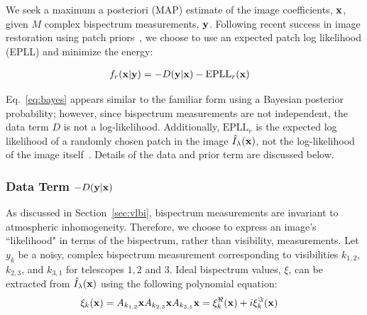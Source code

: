 {%
We seek a maximum a posteriori (MAP) estimate of the image coefficients, ${\bf x}$, given $M$ complex bispectrum measurements, ${\bf y}$.
Following recent success in image restoration using patch priors~\cite{zoran2011learning, zoran2012natural}, we choose to use an expected patch log likelihood (EPLL) and minimize the energy:

\begin{align} 
f_r({\bf x} | {\bf y} )
&=  - D ({\bf y}|{\bf x}) - \mbox{EPLL}_r({\bf x})
\label{eq:bayes}
\end{align}
 \vspace{-.2in}


Eq.~\ref{eq:bayes} appears similar to the familiar form using a Bayesian posterior probability; however, since bispectrum measurements are not independent, the data term $D$ is not a log-likelihood. Additionally, $\mbox{EPLL}_r$ is the expected log likelihood of a randomly chosen patch in the image $\hat{I}_{\lambda}({\bf x})$, not the log-likelihood of the image itself~\cite{zoran2011learning}. 
Details of the data and prior term are discussed below. 



\subsubsection{Data Term $- D ({\bf y}|{\bf x})$ }


As discussed in Section~\ref{sec:vlbi}, bispectrum measurements are invariant to atmospheric inhomogeneity. 
Therefore, we choose to express an image's ``likelihood" in terms of the bispectrum, rather than visibility, measurements. Let $y_k$ be a noisy, complex bispectrum measurement corresponding to visibilities $k_{1,2}$, $k_{2,3}$, and $k_{3,1}$ for telescopes $1,2$ and $3$. 
Ideal bispectrum values, $\xi$, can be extracted from $\hat{I}_{\lambda}({\bf x})$ using the following polynomial equation:
{\small 
	\begin{align}
	&\xi_k({\bf x}) =  A_{k_{1,2}} {\bf x}  A_{k_{2,3}}{\bf x}  A_{k_{3,1}}{\bf x}  = \xi_k^\Re({\bf x}) + i \xi_k^\Im({\bf x}) 
	\end{align}
}

}
